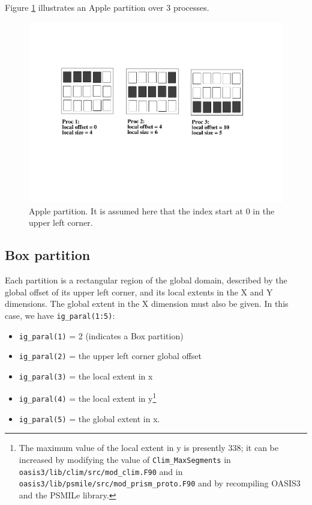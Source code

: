 Figure \ref{apple_partition} illustrates an Apple partition over 3
processes. 
\begin{figure}
\includegraphics[scale=.6]{figures/apple_new} 
\caption{Apple partition. It is assumed here that the index start at 0 in the upper left corner.}
\label{apple_partition}
\end{figure}


\subsection{Box partition} 

Each partition is a rectangular region of the global domain, described
by the global offset of its upper left corner, and its local extents in the
X and Y dimensions. The global extent in the X dimension must also be
given. In this case, we have {\tt ig\_paral(1:5)}:
\begin{itemize}
 \item {\tt ig\_paral(1)} = 2 (indicates a Box partition)
 \item {\tt ig\_paral(2)} = the upper left corner global offset
 \item {\tt ig\_paral(3)} = the local extent in x
 \item {\tt ig\_paral(4)} = the local extent in y\footnote{The maximum
value of the local extent in y is presently 338; it can be increased
by modifying the value of {\tt Clim\_MaxSegments} in {\tt
oasis3/lib/clim/src/mod\_clim.F90} and in {\tt
oasis3/lib/psmile/src/mod\_prism\_proto.F90} and by recompiling
OASIS3 and the PSMILe library.}
 \item {\tt ig\_paral(5)} = the global extent in x.
\end{itemize}

